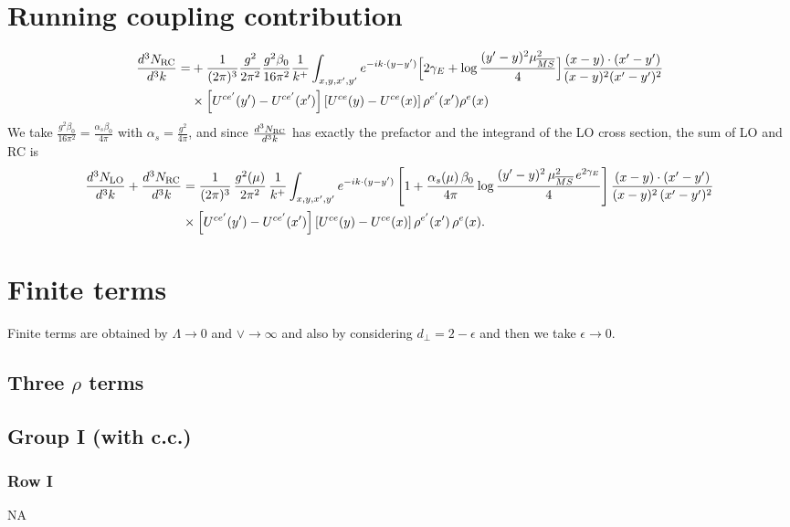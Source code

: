 \documentclass[9pt]{article}
\numberwithin{equation}{section}
\begin{document}
\section{Running coupling contribution}
\begin{align}
\frac{d^{3}N_{\rm RC}}{d^{3}k}= & +\frac{1}{(2\pi)^{3}}\frac{g^{2}}{2\pi^{2}}\frac{g^{2}\beta_{0}}{16\pi^{2}}\frac{1}{k^{+}}\int_{x,y,x',y'}e^{-ik\cdot(y-y')}\Big[2\gamma_{E}+\log\frac{(y'-y)^{2}\mu^{2}_{\overline{MS}}}{4}\Big]\frac{(x-y)\cdot(x'-y')}{(x-y)^{2}(x'-y')^{2}}\notag\\
&\times\left[U^{ce'}(y') - U^{ce'}(x')\right]\left[U^{ce}(y) - U^{ce}(x)\right]\rho^{e'}(x')\rho^{e}(x)
\end{align}
We take $\frac{g^{2}\beta_{0}}{16\pi^{2}}=\frac{\alpha_{s}\beta_{0}}{4\pi}$ with $\alpha_{s}=\frac{g^{2}}{4\pi}$, and since $\frac{d^{3}N_{\rm RC}}{d^{3}k}$ has exactly the prefactor and the integrand of the LO cross section, the sum of LO and RC is
\begin{align}
\frac{d^{3}N_{\rm LO}}{d^{3}k}+\frac{d^{3}N_{\rm RC}}{d^{3}k}&=\frac{1}{(2\pi)^{3}}\,\frac{g^{2}(\mu)}{2\pi^{2}}\,\frac{1}{k^{+}}\int_{x,y,x',y'}e^{-ik\cdot(y-y')}\left[1+\frac{\alpha_{s}(\mu)\,\beta_{0}}{4\pi}\log\frac{(y'-y)^{2}\,\mu^{2}_{\overline{MS}}\,e^{2\gamma_{E}}}{4}\right]\frac{(x-y)\cdot(x'-y')}{(x-y)^{2}\,(x'-y')^{2}}\notag\\
&\times\left[U^{ce'}(y')-U^{ce'}(x')\right]\left[U^{ce}(y)-U^{ce}(x)\right]\rho^{e'}(x')\,\rho^{e}(x).
\end{align}
\section{Finite terms}
Finite terms are obtained by $\Lambda \to 0$ and $\vee\to \infty $ and also by considering $d_{\perp} = 2-\epsilon$ and then we take $\epsilon \to 0$. 
\subsection*{Three $\rho$ terms}
\subsection{Group I (with c.c.)}
\subsubsection*{Row I} \textsc{NA}
\end{document}
